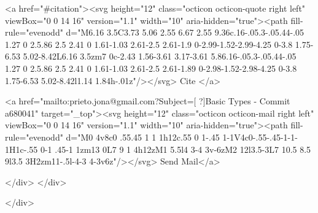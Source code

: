       <a  href="#citation"><svg height="12" class="octicon octicon-quote right left" viewBox="0 0 14 16" version="1.1" width="10" aria-hidden="true"><path fill-rule="evenodd" d="M6.16 3.5C3.73 5.06 2.55 6.67 2.55 9.36c.16-.05.3-.05.44-.05 1.27 0 2.5.86 2.5 2.41 0 1.61-1.03 2.61-2.5 2.61-1.9 0-2.99-1.52-2.99-4.25 0-3.8 1.75-6.53 5.02-8.42L6.16 3.5zm7 0c-2.43 1.56-3.61 3.17-3.61 5.86.16-.05.3-.05.44-.05 1.27 0 2.5.86 2.5 2.41 0 1.61-1.03 2.61-2.5 2.61-1.89 0-2.98-1.52-2.98-4.25 0-3.8 1.75-6.53 5.02-8.42l1.14 1.84h-.01z"/></svg> Cite
      </a>

      <a href="mailto:prieto.jona@gmail.com?Subject=[ ?]Basic Types - Commit a680041" target="_top"><svg height="12" class="octicon octicon-mail right left" viewBox="0 0 14 16" version="1.1" width="10" aria-hidden="true"><path fill-rule="evenodd" d="M0 4v8c0 .55.45 1 1 1h12c.55 0 1-.45 1-1V4c0-.55-.45-1-1-1H1c-.55 0-1 .45-1 1zm13 0L7 9 1 4h12zM1 5.5l4 3-4 3v-6zM2 12l3.5-3L7 10.5 8.5 9l3.5 3H2zm11-.5l-4-3 4-3v6z"/></svg> Send Mail</a>

    </div>
  </div>

</div>




